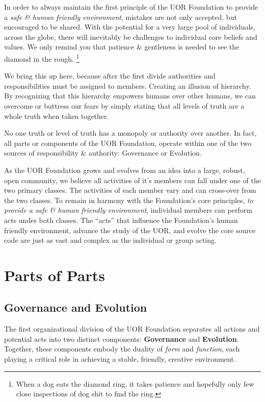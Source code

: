\documentclass[twocolumn,10pt]{article}
\begin{document}
In order to always maintain the first principle of the UOR Foundation to provide a \textit{safe \& human friendly environment}, mistakes are not only accepted, but encouraged to be shared.
With the potential for a very large pool of individuals, across the globe, there will inevitably be challenges to individual core beliefs and values.
We only remind you that patience \& gentleness is needed to see the diamond in the rough.
\footnote{When a dog eats the diamond ring, it takes patience and hopefully only few close inspections of dog shit to find the ring.}

We bring this up here, because after the first divide authorities and responsibilities must be assigned to members.
Creating an illusion of hierarchy.
By recognizing that this hierarchy empowers humans over other humans, we can overcome or buttress our fears by simply stating that all levels of truth are a whole truth when taken together.

No one truth or level of truth has a monopoly or authority over another.
In fact, all parts or components of the UOR Foundation, operate within one of the two sources of responsibility \& authority:
Governance or Evolution.

As the UOR Foundation grows and evolves from an idea into a large, robust, open community, we believe all activities of it's members can fall under one of the two primary classes.
The activities of each member vary and can cross-over from the two classes.
To remain in harmony with the Foundation's core principles, \textit{to provide a safe \& human friendly environment}, individual members can perform acts under both classes.
The ``acts'' that influence the Foundation's human friendly environment, advance the study of the UOR, and evolve the core source code are just as vast and complex as the individual or group acting.

\section*{Parts of Parts}
\subsection*{Governance and Evolution}
The first organizational division of the UOR Foundation separates all actions and potential acts into two distinct components: \textbf{Governance} and \textbf{Evolution}.
Together, these components embody the duality of \textit{form} and \textit{function}, each playing a critical role in achieving a stable, friendly, creative environment.
\end{document}
